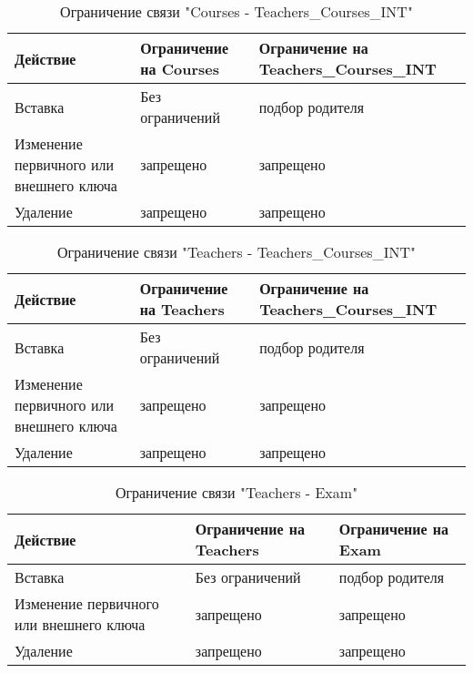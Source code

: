 \documentclass[a4paper, 14pt]{extarticle}
\begin{document}
\begin{table}[H]
\centering
\captionsetup{singlelinecheck=false, justification=raggedright}
\caption{Ограничение связи "Courses - Teachers\_Courses\_INT"}
    \begin{tabular}
        {|p{4cm}|p{5cm}|p{5cm}|}
        \hline
        Действие & Ограничение на Courses & Ограничение на Teachers\_Courses\_INT \\
        \hline
        Вставка & Без ограничений & подбор родителя \\
        \hline
        Изменение первичного или внешнего ключа & запрещено & запрещено \\
        \hline
        Удаление & запрещено & запрещено \\
    \hline
    \end{tabular}
\end{table}

\begin{table}[H]
\centering
\captionsetup{singlelinecheck=false, justification=raggedright}
\caption{Ограничение связи "Teachers - Teachers\_Courses\_INT"}
    \begin{tabular}
        {|p{4cm}|p{5cm}|p{5cm}|}
        \hline
        Действие & Ограничение на Teachers & Ограничение на Teachers\_Courses\_INT \\
        \hline
        Вставка & Без ограничений & подбор родителя \\
        \hline
        Изменение первичного или внешнего ключа & запрещено & запрещено \\
        \hline
        Удаление & запрещено & запрещено \\
    \hline
    \end{tabular}
\end{table}

\begin{table}[H]
\centering
\captionsetup{singlelinecheck=false, justification=raggedright}
\caption{Ограничение связи "Teachers - Exam"}
    \begin{tabular}
        {|p{4cm}|p{5cm}|p{5cm}|}
        \hline
        Действие & Ограничение на Teachers & Ограничение на Exam \\
        \hline
        Вставка &  Без ограничений & подбор родителя \\
        \hline
        Изменение первичного или внешнего ключа & запрещено & запрещено \\
        \hline
        Удаление & запрещено & запрещено \\
    \hline
    \end{tabular}
\end{table}
\end{document}
